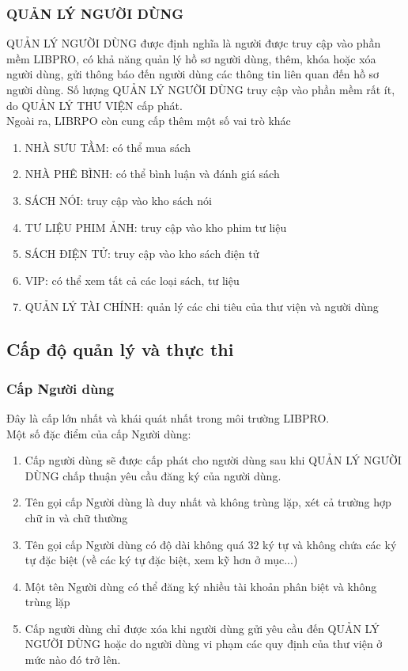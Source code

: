 \documentclass[12pt,a4paper]{report}
\begin{document}
            \subsubsection{QUẢN LÝ NGƯỜI DÙNG}
                QUẢN LÝ NGƯỜI DÙNG được định nghĩa là người được truy cập vào phần mềm LIBPRO, có khả năng quản lý hồ sơ người dùng, thêm, khóa hoặc xóa người dùng, gửi thông báo đến người dùng các thông tin liên quan đến hồ sơ người dùng.
                Số lượng QUẢN LÝ NGƯỜI DÙNG truy cập vào phần mềm rất ít, do QUẢN LÝ THƯ VIỆN cấp phát.\\
        Ngoài ra, LIBRPO còn cung cấp thêm một số vai trò khác
        \begin{enumerate}
            \item NHÀ SƯU TẦM: có thể mua sách
            \item NHÀ PHÊ BÌNH: có thể bình luận và đánh giá sách
            \item SÁCH NÓI: truy cập vào kho sách nói
            \item TƯ LIỆU PHIM ẢNH: truy cập vào kho phim tư liệu
            \item SÁCH ĐIỆN TỬ: truy cập vào kho sách điện tử
            \item VIP: có thể xem tất cả các loại sách, tư liệu
            \item QUẢN LÝ TÀI CHÍNH: quản lý các chi tiêu của thư viện và người dùng
        \end{enumerate}
        \subsection{Cấp độ quản lý và thực thi}
            \subsubsection{Cấp Người dùng}
            Đây là cấp lớn nhất và khái quát nhất trong môi trường LIBPRO.\\
            Một số đặc điểm của cấp Người dùng:
            \begin{enumerate}
                \item Cấp người dùng sẽ được cấp phát cho người dùng sau khi QUẢN LÝ NGƯỜI DÙNG chấp thuận yêu cầu đăng ký của người dùng.
                \item Tên gọi cấp Người dùng là duy nhất và không trùng lặp, xét cả trường hợp chữ in và chữ thường
                \item Tên gọi cấp Người dùng có độ dài không quá 32 ký tự và không chứa các ký tự đặc biệt (về các ký tự đặc biệt, xem kỹ hơn ở mục...)
                \item Một tên Người dùng có thể đăng ký nhiều tài khoản phân biệt và không trùng lặp
                \item Cấp người dùng chỉ được xóa khi người dùng gửi yêu cầu đến QUẢN LÝ NGƯỜI DÙNG hoặc do người dùng vi phạm các quy định của thư viện ở mức nào đó trở lên.
            \end{enumerate}
\end{document}
